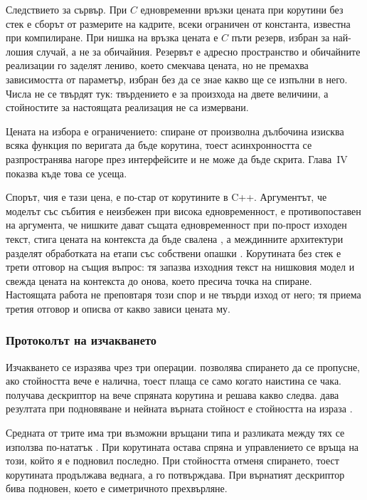 Следствието за сървър. При \(C\) едновременни връзки цената при корутини без стек е сборът от
размерите на кадрите, всеки ограничен от константа, известна при компилиране. При нишка на
връзка цената е \(C\) пъти резерв, избран за най-лошия случай, а не за обичайния. Резервът е
адресно пространство и обичайните реализации го заделят лениво, което смекчава цената, но не
премахва зависимостта от параметър, избран без да се знае какво ще се изпълни в него. Числа
не се твърдят тук: твърдението е за произхода на двете величини, а стойностите за настоящата
реализация не са измервани.

Цената на избора е ограничението: спиране от произволна дълбочина изисква всяка функция по
веригата да бъде корутина, тоест асинхронността се разпространява нагоре през интерфейсите и
не може да бъде скрита. Глава~IV показва къде това се усеща.

Спорът, чия е тази цена, е по-стар от корутините в C++. Аргументът, че моделът със събития е
неизбежен при висока едновременност, е противопоставен на аргумента, че нишките дават същата
едновременност при по-прост изходен текст, стига цената на контекста да бъде свалена
\cite{vonbehren2003events}, а междинните архитектури разделят обработката на етапи със
собствени опашки \cite{welsh2001seda}. Корутината без стек е трети отговор на същия въпрос:
тя запазва изходния текст на нишковия модел и свежда цената на контекста до онова, което
пресича точка на спиране. Настоящата работа не преповтаря този спор и не твърди изход от
него; тя приема третия отговор и описва от какво зависи цената му.

\subsubsection{Протоколът на изчакването}

Изчакването се изразява чрез три операции.  позволява спирането да се
пропусне, ако стойността вече е налична, тоест плаща се само когато наистина се чака.
 получава дескриптор на вече спряната корутина и решава какво следва.
 дава резултата при подновяване и нейната върната стойност е стойността
на израза .

Средната от трите има три възможни връщани типа и разликата между тях се използва по-нататък
\cite{cpp20standard}. При  корутината остава спряна и управлението се връща на
този, който я е подновил последно. При  стойността  отменя спирането,
тоест корутината продължава веднага, а  го потвърждава. При
 върнатият дескриптор бива подновен, което е симетричното
прехвърляне.

